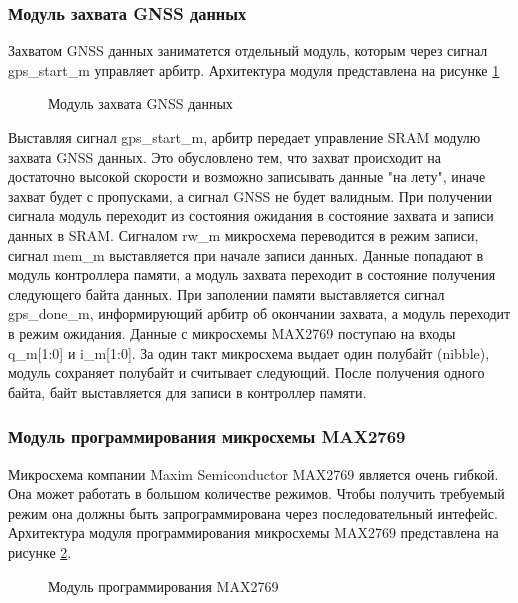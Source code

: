 \subsubsection{Модуль захвата GNSS данных}
\label{sec:gps_acq}
Захватом GNSS данных заниматется отдельный модуль, которым через сигнал gps\_start\_m управляет арбитр. Архитектура модуля
представлена на рисунке \ref{pic:gps_main_arch}

\begin{figure}[H]
\begin{center}
\end{center}
\caption{Модуль захвата GNSS данных}
\label{pic:gps_main_arch}
\end{figure}

Выставляя сигнал gps\_start\_m, арбитр передает управление SRAM модулю захвата GNSS данных. Это обусловлено тем, что захват 
происходит на достаточно высокой скорости и возможно записывать данные "на лету", иначе захват будет с пропусками, а сигнал GNSS
не будет валидным. При получении сигнала модуль переходит из состояния ожидания в состояние захвата и записи данных в SRAM. 
Сигналом rw\_m микросхема переводится в режим записи, сигнал mem\_m выставляется при начале записи данных. Данные попадают
в модуль контроллера памяти, а модуль захвата переходит в состояние получения следующего байта данных. При заполении памяти
выставляется сигнал gps\_done\_m, информирующий арбитр об окончании захвата, а модуль переходит в режим ожидания. Данные с
микросхемы MAX2769 поступаю на входы q\_m[1:0] и i\_m[1:0]. За один такт микросхема выдает один полубайт (nibble), модуль
сохраняет полубайт и считывает следующий. После получения одного байта, байт выставляется для записи в контроллер памяти.

\subsubsection{Модуль программирования микросхемы MAX2769}
\label{sec:gps_program}
Микросхема компании Maxim Semiconductor MAX2769 является очень гибкой. Она может работать в большом количестве режимов.
Чтобы получить требуемый режим она должны быть запрограммирована через последовательный интефейс. Архитектура модуля
программирования микросхемы MAX2769 представлена на рисунке \ref{pic:gps_program}.

\begin{figure}[H]
\begin{center}
\end{center}
\caption{Модуль программирования MAX2769}
\label{pic:gps_program}
\end{figure}

